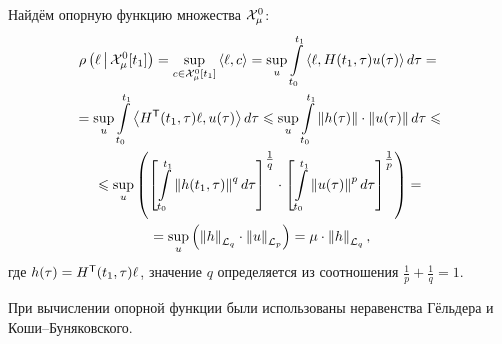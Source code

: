 Найдём опорную функцию множества $\mathcal{X}_\mu^0$:
\begin{gather*}
  \rho\left(\ell\,\middle|\,\mathcal{X}_\mu^0[t_1]\right) =
    \sup_{c \in \mathcal{X}_\mu^0[t_1]} \left<\ell,c\right> =
    \sup_{u} \int\limits_{t_0}^{t_1} \left<\ell,H(t_1, \tau) u(\tau)\right> d\tau = {}\\
  {} = \sup_{u} \int\limits_{t_0}^{t_1} \left<H^{\mathsf{T}}(t_1, \tau) \ell,u(\tau)\right> d\tau \leqslant
    \sup_{u} \int\limits_{t_0}^{t_1} \left\| h(\tau) \right\| \cdot \left\| u(\tau) \right\| d\tau \leqslant{}\\
  {} \leqslant \sup_{u}
    \left(
      \left[\int\limits_{t_0}^{t_1} \left\| h(t_1, \tau) \right\|^q d\tau \right]^{\tfrac{1}{q}} \cdot
      \left[\int\limits_{t_0}^{t_1} \left\| u(\tau) \right\|^p d\tau \right]^{\tfrac{1}{p}}
    \right) = {}\\
  {} = \sup_{u} \left( \left\| h \right\|_{{\mathcal{L}_q}} \cdot \left\| u \right\|_{{\mathcal{L}_p}} \right) =
    \mu \cdot \left\| h \right\|_{{\mathcal{L}_q}},
\end{gather*}
где $h(\tau) = H^{\mathsf{T}}(t_1, \tau) \ell$, значение $q$ определяется из соотношения $\frac{1}{p} + \frac{1}{q} = 1$.

\begin{note}
  При вычислении опорной функции были использованы неравенства Гёльдера
  и Коши--Буняковского.
\end{note}

%

